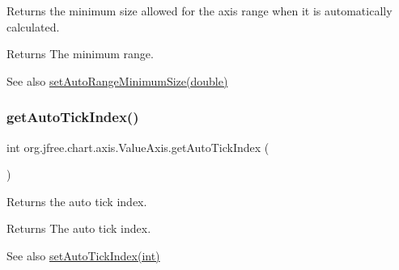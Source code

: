 Returns the minimum size allowed for the axis range when it is automatically calculated.

\begin{DoxyReturn}{Returns}
The minimum range.
\end{DoxyReturn}
\begin{DoxySeeAlso}{See also}
\mbox{\hyperlink{classorg_1_1jfree_1_1chart_1_1axis_1_1_value_axis_a70efada90ae6f8ed6f4cc34052adec3f}{set\+Auto\+Range\+Minimum\+Size(double)}} 
\end{DoxySeeAlso}
\mbox{\label{classorg_1_1jfree_1_1chart_1_1axis_1_1_value_axis_a385f69ce6843fd1b708610d3b2e5047a}} 
\subsubsection{\texorpdfstring{get\+Auto\+Tick\+Index()}{getAutoTickIndex()}}
{\footnotesize\ttfamily int org.\+jfree.\+chart.\+axis.\+Value\+Axis.\+get\+Auto\+Tick\+Index (\begin{DoxyParamCaption}{ }\end{DoxyParamCaption})\hspace{0.3cm}{\ttfamily [protected]}}

Returns the auto tick index.

\begin{DoxyReturn}{Returns}
The auto tick index.
\end{DoxyReturn}
\begin{DoxySeeAlso}{See also}
\mbox{\hyperlink{classorg_1_1jfree_1_1chart_1_1axis_1_1_value_axis_af2dcbd83d70a20e207492f3b8b02d9d1}{set\+Auto\+Tick\+Index(int)}} 
\end{DoxySeeAlso}
\mbox{\label{classorg_1_1jfree_1_1chart_1_1axis_1_1_value_axis_a37169f8d6ba2253f608421b4af73155c}} 
